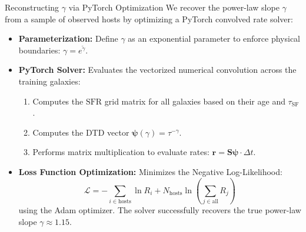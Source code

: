 \documentclass[9pt]{beamer}
\begin{document}
\begin{frame}{Reconstructing $\gamma$ via PyTorch Optimization}
  We recover the power-law slope $\gamma$ from a sample of observed hosts by optimizing a PyTorch convolved rate solver:
  \begin{itemize}
    \item \textbf{Parameterization:} Define $\gamma$ as an exponential parameter to enforce physical boundaries: $\gamma = e^{\tilde{\gamma}}$.
    \item \textbf{PyTorch Solver:} Evaluates the vectorized numerical convolution across the training galaxies:
      \begin{enumerate}
        \item Computes the $\text{SFR}$ grid matrix for all galaxies based on their age and $\tau_{\text{SF}}$.
        \item Computes the DTD vector $\boldsymbol{\psi}(\gamma) = \tau^{-\gamma}$.
        \item Performs matrix multiplication to evaluate rates: $\mathbf{r} = \mathbf{S} \boldsymbol{\psi} \cdot \Delta t$.
      \end{enumerate}
    \item \textbf{Loss Function Optimization:} Minimizes the Negative Log-Likelihood:
      $$\mathcal{L} = -\sum_{i \in \text{hosts}} \ln R_i + N_{\text{hosts}} \ln \left( \sum_{j \in \text{all}} R_j \right)$$
      using the Adam optimizer. The solver successfully recovers the true power-law slope $\gamma \approx 1.15$.
  \end{itemize}
\end{frame}
\end{document}
